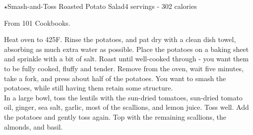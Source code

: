 \begin{recipe}{\texorpdfstring{$\star$}{str}Smash-and-Toss Roasted Potato Salad}{4 servings - 302 calories}{}

\freeform From 101 Cookbooks.


Heat oven to 425F. Rinse the potatoes, and pat dry with a clean dish towel, absorbing as much extra water as possible. Place the potatoes on a baking sheet and sprinkle with a bit of salt. Roast until well-cooked through - you want them to be fully cooked, fluffy and tender. Remove from the oven, wait five minutes, take a fork, and press about half of the potatoes. You want to smash the potatoes, while still having them retain some structure.\\

In a large bowl, toss the lentils with the sun-dried tomatoes, sun-dried tomato oil, ginger, sea salt, garlic, most of the scallions, and lemon juice. Toss well. Add the potatoes and gently toss again. Top with the remaining scallions, the almonds, and basil.
\end{recipe}